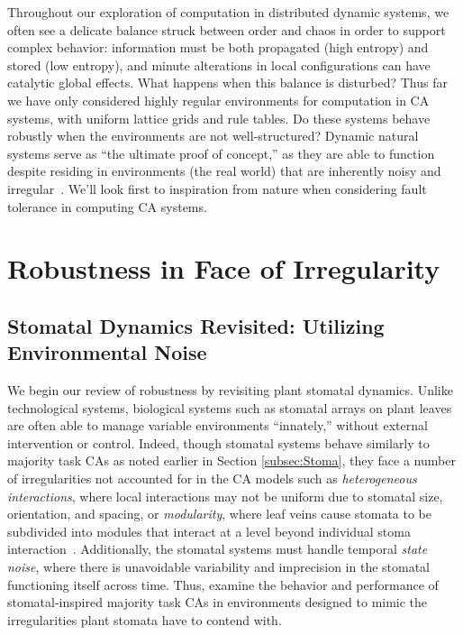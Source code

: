 \documentclass[a4paper,11pt,twoside]{report}
\begin{document}
Throughout our exploration of computation in distributed dynamic systems, we often see a delicate balance struck between order and chaos in order to support complex behavior: information must be both propagated (high entropy) and stored (low entropy), and minute alterations in local configurations can have catalytic global effects. What happens when this balance is disturbed? Thus far we have only considered highly regular environments for computation in CA systems, with uniform lattice grids and rule tables. Do these systems behave robustly when the environments are not well-structured? Dynamic natural systems serve as ``the ultimate proof of concept,'' as they are able to function despite residing in environments (the real world) that are inherently noisy and irregular~\cite{si99}. We'll look first to inspiration from nature when considering fault tolerance in computing CA systems. 



\section{Robustness in Face of Irregularity}
\label{sec:Robust}

\subsection{Stomatal Dynamics Revisited: Utilizing Environmental Noise}
We begin our review of robustness by revisiting plant stomatal dynamics. Unlike technological systems, biological systems such as stomatal arrays on plant leaves are often able to manage variable environments ``innately,'' without external intervention or control. Indeed, though stomatal systems behave similarly to majority task CAs as noted earlier in Section \ref{subsec:Stoma}, they face a number of irregularities not accounted for in the CA models such as \textit{heterogeneous interactions}, where local interactions may not be uniform due to stomatal size, orientation, and spacing,  or \textit{modularity}, where leaf veins cause stomata to be subdivided into modules that interact at a level beyond individual stoma interaction~\cite{me07}. Additionally, the stomatal systems must handle temporal \textit{state noise}, where there is unavoidable variability and imprecision in the stomatal functioning itself across time. Thus, \citeauthor{me07} examine the behavior and performance of stomatal-inspired majority task CAs in environments designed to mimic the irregularities plant stomata have to contend with.
\end{document}
